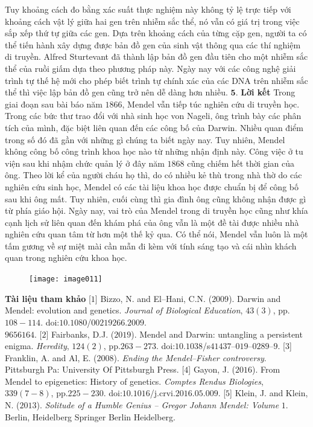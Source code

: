 \begin{multicols}{2}
\begin{figure}[H]
		\vspace*{-10pt}
	\end{figure}
	Tuy khoảng cách đo bằng xác suất thực nghiệm này không tỷ lệ trực tiếp với khoảng cách vật lý giữa hai gen trên nhiễm sắc thể, nó vẫn có giá trị trong việc sắp xếp thứ tự giữa các gen. Dựa trên khoảng cách của từng cặp gen, người ta có thể tiến hành xây dựng được bản đồ gen của sinh vật thông qua các thí nghiệm di truyền. Alfred Sturtevant đã thành lập bản đồ gen đầu tiên cho một nhiễm sắc thể của ruồi giấm dựa theo phương pháp này.
	\vskip 0.1cm
	Ngày nay với các công nghệ giải trình tự thế hệ mới cho phép biết trình tự chính xác của các DNA trên nhiễm sắc thể thì việc lập bản đồ gen cũng trở nên dễ dàng hơn nhiều.
	\vskip 0.1cm
	$\pmb{5.}$ \textbf{\color{timhieukhoahoc}Lời kết}
	\vskip 0.1cm
	Trong giai đoạn sau bài báo năm $1866$, Mendel vẫn tiếp túc nghiên cứu di truyền học. Trong các bức thư trao đổi với nhà sinh học von Nageli, ông trình bày các phân tích của mình, đặc biệt liên quan đến các công bố của Darwin. Nhiều quan điểm trong số đó đã gần với những gì chúng ta biết ngày nay. Tuy nhiên, Mendel không công bố công trình khoa học nào từ những nhận định này. Công việc ở tu viện sau khi nhậm chức quản lý ở đây năm $1868$ cũng chiếm hết thời gian của ông. Theo lời kể của người cháu họ thì, do có nhiều kẻ thù trong nhà thờ do các nghiên cứu sinh học, Mendel có các tài liệu khoa học được chuẩn bị để công bố sau khi ông mất. Tuy nhiên, cuối cùng thì gia đình ông cũng không nhận được gì từ phía giáo hội.
	\vskip 0.1cm
	Ngày nay, vai trò của Mendel trong di truyền học cũng như khía cạnh lịch sử liên quan đến khám phá của ông vẫn là một đề tài được nhiều nhà nghiên cứu quan tâm từ hơn một thế kỷ qua. Có thể nói, Mendel vẫn luôn là một tấm gương về sự miệt mài cần mẫn đi kèm với tính sáng tạo và cái nhìn khách quan trong nghiên cứu khoa học.
	\begin{figure}[H]
		\centering
		\vspace*{-5pt}
		\captionsetup{labelformat= empty, justification=centering}
		\texttt{[image: image011]}
		\vspace*{-10pt}
	\end{figure}
	\columnbreak
	\textbf{\color{timhieukhoahoc}Tài liệu tham khảo}
	\vskip 0.1cm
	[$1$] Bizzo, N. and El--Hani, C.N. ($2009$). Darwin and Mendel: evolution and genetics. \textit{Journal of Biological Education}, $43(3)$, pp.$108-114$. doi:$10.1080$/$00219266$.$2009$.\\$9656164$.
	\vskip 0.1cm
	[$2$] Fairbanks, D.J. ($2019$). Mendel and Darwin: untangling a persistent enigma. \textit{Heredity}, $124(2)$, pp.$263-273$. doi:$10.1038$/s$41437$--$019$--$0289$--$9$.
	\vskip 0.1cm
	[$3$] Franklin, A. and Al, E. ($2008$). \textit{Ending the Mendel--Fisher controversy}. Pittsburgh Pa: University Of Pittsburgh Press.
	\vskip 0.1cm
	[$4$] Gayon, J. ($2016$). From Mendel to epigenetics: History of genetics. \textit{Comptes Rendus Biologies}, $339(7-8)$, pp.$225-230$. doi:$10$.$1016$/j.crvi.$2016$.$05$.$009$.
	\vskip 0.1cm
	[$5$] Klein, J. and Klein, N. ($2013$). \textit{Solitude of a Humble Genius -- Gregor Johann Mendel: Volume} $1$. Berlin, Heidelberg Springer Berlin Heidelberg.
\end{multicols}